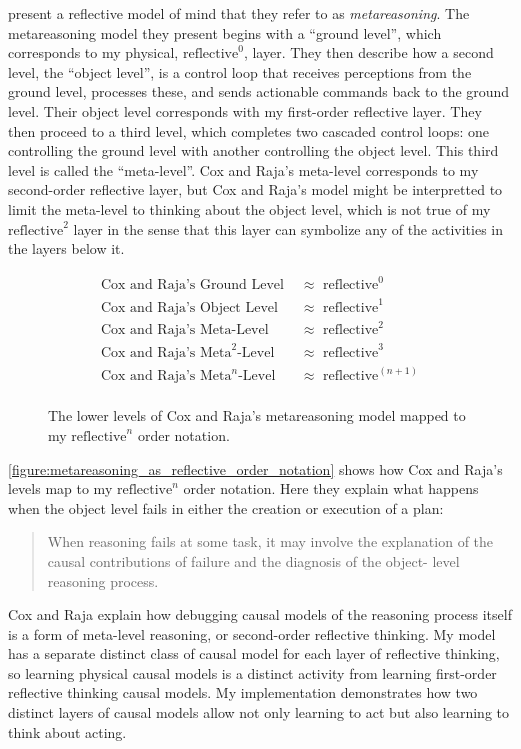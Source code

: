 \cite{cox_and_raja:2008} present a reflective model of mind that they
refer to as \emph{metareasoning}.  The metareasoning model they
present begins with a ``ground level'', which corresponds to my
physical, $\text{reflective}^0$, layer.  They then describe how a
second level, the ``object level'', is a control loop that receives
perceptions from the ground level, processes these, and sends
actionable commands back to the ground level.  Their object level
corresponds with my first-order reflective layer.  They then proceed
to a third level, which completes two cascaded control loops: one
controlling the ground level with another controlling the object
level.  This third level is called the ``meta-level''.  Cox and Raja's
meta-level corresponds to my second-order reflective layer, but Cox
and Raja's model might be interpretted to limit the meta-level to
thinking about the object level, which is not true of my
$\text{reflective}^2$ layer in the sense that this layer can symbolize
any of the activities in the layers below it.
\begin{figure}[bth]
\begin{align*}
\text{Cox and Raja's Ground Level } &{\approx} \text{ reflective}^0 \\
\text{Cox and Raja's Object Level } &{\approx} \text{ reflective}^1 \\
\text{Cox and Raja's Meta-Level }   &{\approx} \text{ reflective}^2 \\
\text{Cox and Raja's $\text{Meta}^2$-Level } &{\approx} \text{ reflective}^3 \\
\text{Cox and Raja's $\text{Meta}^n$-Level } &{\approx} \text{ reflective}^{(n+1)} \\
\end{align*}
\caption{The lower levels of Cox and Raja's metareasoning model mapped
  to my $\text{reflective}^n$ order notation.}
\label{figure:metareasoning_as_reflective_order_notation}
\end{figure}
\autoref{figure:metareasoning_as_reflective_order_notation} shows how
Cox and Raja's levels map to my $\text{reflective}^n$ order notation.
Here they explain what happens when the object level fails in either
the creation or execution of a plan:
\begin{quote}
When reasoning fails at some task, it may involve the explanation of
the causal contributions of failure and the diagnosis of the object-
level reasoning process.
\end{quote}
Cox and Raja explain how debugging causal models of the reasoning
process itself is a form of meta-level reasoning, or second-order
reflective thinking.  My model has a separate distinct class of causal
model for each layer of reflective thinking, so learning physical
causal models is a distinct activity from learning first-order
reflective thinking causal models.  My implementation demonstrates how
two distinct layers of causal models allow not only learning to act
but also learning to think about acting.

